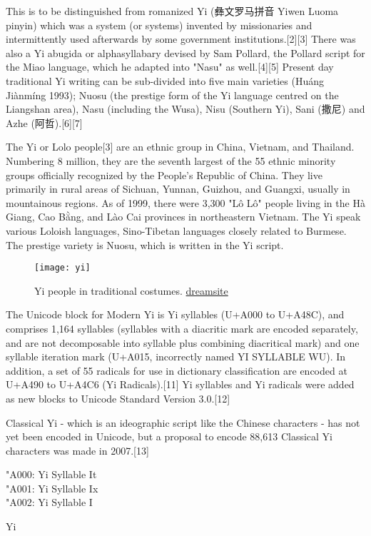 This is to be distinguished from romanized Yi ({\yi 彝文罗马拼音} Yiwen Luoma pinyin) which was a system (or systems) invented by missionaries and intermittently used afterwards by some government institutions.[2][3] There was also a Yi abugida or alphasyllabary devised by Sam Pollard, the Pollard script for the Miao language, which he adapted into "Nasu" as well.[4][5] Present day traditional Yi writing can be sub-divided into five main varieties (Huáng Jiànmíng 1993); Nuosu (the prestige form of the Yi language centred on the Liangshan area), Nasu (including the Wusa), Nisu (Southern Yi), Sani ({\yi 撒尼}) and 
Azhe ({\yi 阿哲}).[6][7]


The Yi or Lolo people[3] are an ethnic group in China, Vietnam, and Thailand. Numbering 8 million, they are the seventh largest of the 55 ethnic minority groups officially recognized by the People's Republic of China. They live primarily in rural areas of Sichuan, Yunnan, Guizhou, and Guangxi, usually in mountainous regions. As of 1999, there were 3,300 "Lô Lô" people living in the Hà Giang, Cao Bằng, and Lào Cai provinces in northeastern Vietnam.
The Yi speak various Loloish languages, Sino-Tibetan languages closely related to Burmese. The prestige variety is Nuosu, which is written in the Yi script.

\begin{figure}[htbp]
\texttt{[image: yi]}

\caption{Yi people in traditional costumes. \href{https://www.dreamstime.com/stock-photos-yi-minority-women-traditional-clothes-image25450383}{dreamsite}}
\end{figure}


The Unicode block for Modern Yi is Yi syllables (U+A000 to U+A48C), and comprises 1,164 syllables (syllables with a diacritic mark are encoded separately, and are not decomposable into syllable plus combining diacritical mark) and one syllable iteration mark (U+A015, incorrectly named YI SYLLABLE WU). In addition, a set of 55 radicals for use in dictionary classification are encoded at U+A490 to U+A4C6 (Yi Radicals).[11] Yi syllables and Yi radicals were added as new blocks to Unicode Standard Version 3.0.[12]

Classical Yi - which is an ideographic script like the Chinese characters - has not yet been encoded in Unicode, but a proposal to encode 88,613 Classical Yi characters was made in 2007.[13]

\bgroup
\yi \char"A000: Yi Syllable It\\

\yi \char"A001: Yi Syllable Ix\\

\yi \char"A002: Yi Syllable I\\
\egroup

\begin{scriptexample}[]{Yi}
\end{scriptexample}



